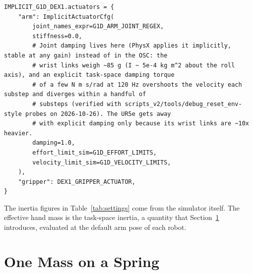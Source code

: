 \begin{snippetbox}[10]
\begin{lstlisting}[firstnumber=136]
IMPLICIT_G1D_DEX1.actuators = {
    "arm": ImplicitActuatorCfg(
        joint_names_expr=G1D_ARM_JOINT_REGEX,
        stiffness=0.0,
        # Joint damping lives here (PhysX applies it implicitly, stable at any gain) instead of in the OSC: the
        # wrist links weigh ~85 g (I ~ 5e-4 kg m^2 about the roll axis), and an explicit task-space damping torque
        # of a few N m s/rad at 120 Hz overshoots the velocity each substep and diverges within a handful of
        # substeps (verified with scripts_v2/tools/debug_reset_env-style probes on 2026-10-26). The UR5e gets away
        # with explicit damping only because its wrist links are ~10x heavier.
        damping=1.0,
        effort_limit_sim=G1D_EFFORT_LIMITS,
        velocity_limit_sim=G1D_VELOCITY_LIMITS,
    ),
    "gripper": DEX1_GRIPPER_ACTUATOR,
}
\end{lstlisting}
\end{snippetbox}

The inertia figures in Table~\ref{tab:settings} come from the simulator itself. The effective hand mass is the task-space inertia, a quantity that Section~\ref{sec:mass} introduces, evaluated at the default arm pose of each robot.

\section{One Mass on a Spring}
\label{sec:mass}

